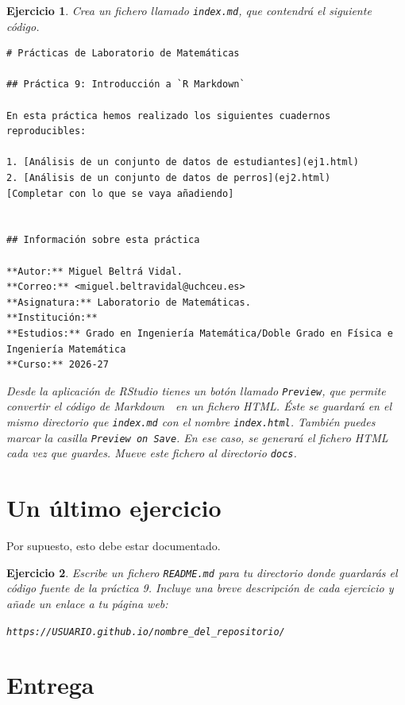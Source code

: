 \documentclass[11pt,a4paper]{article}
\newcommand{\Markdown}{Markdown~\faIcon{markdown}}
\theoremstyle{exercise}
\newtheorem{exercise}{Ejercicio}
\begin{document}
\begin{exercise} Crea un fichero llamado \texttt{index.md}, que contendrá el siguiente código.

\begin{lstlisting}[style=mdstyle]
# Prácticas de Laboratorio de Matemáticas

## Práctica 9: Introducción a `R Markdown`

En esta práctica hemos realizado los siguientes cuadernos reproducibles:

1. [Análisis de un conjunto de datos de estudiantes](ej1.html)
2. [Análisis de un conjunto de datos de perros](ej2.html)
[Completar con lo que se vaya añadiendo]


## Información sobre esta práctica

**Autor:** Miguel Beltrá Vidal.  
**Correo:** <miguel.beltravidal@uchceu.es>  
**Asignatura:** Laboratorio de Matemáticas.  
**Institución:**  
**Estudios:** Grado en Ingeniería Matemática/Doble Grado en Física e Ingeniería Matemática  
**Curso:** 2026-27
\end{lstlisting}

Desde la aplicación de RStudio tienes un botón llamado \texttt{Preview}, que permite convertir el código de \Markdown\ en un fichero HTML. Éste se guardará en el mismo directorio que \texttt{index.md} con el nombre \texttt{index.html}. También puedes marcar la casilla \texttt{Preview on Save}. En ese caso, se generará el fichero HTML cada vez que guardes. Mueve este fichero al directorio \texttt{docs}.
\end{exercise}




\section{Un último ejercicio}


Por supuesto, esto debe estar documentado.

\begin{exercise} Escribe un fichero \texttt{README.md} para tu directorio donde guardarás el código fuente de la práctica 9. Incluye una breve descripción de cada ejercicio y añade un enlace a tu página web:
\begin{center}
	\verb|https://USUARIO.github.io/nombre_del_repositorio/|
\end{center} 
\end{exercise}



\newpage
\section*{Entrega}
\end{document}

